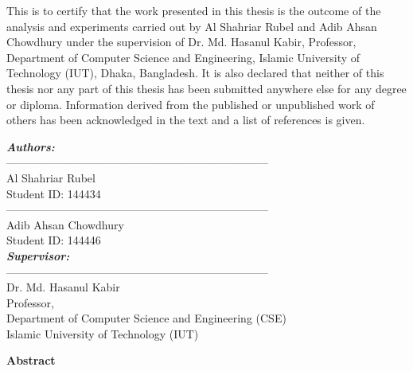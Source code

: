 \documentclass[12pt]{article}
\begin{document}
\noindent This is to certify that the work presented in this thesis is the outcome of the analysis and experiments carried out by Al Shahriar Rubel and Adib Ahsan Chowdhury under the supervision of Dr. Md. Hasanul Kabir, Professor, Department of Computer Science and Engineering, Islamic University of Technology (IUT), Dhaka, Bangladesh. It is also declared that neither of this thesis nor any part of this thesis has been submitted anywhere else for any degree or diploma. Information derived from the published or unpublished work of others has been acknowledged in the text and a list of references is given.

\vspace*{1cm}
\noindent\textit{\Large{\textbf{Authors:}}}\\

\vspace*{1cm}
\noindent -----------------------------------------------------------------------\\
\noindent Al Shahriar Rubel\\
\noindent Student ID: 144434\\ 

\vspace*{1cm}
\noindent -----------------------------------------------------------------------\\
Adib Ahsan Chowdhury\\
Student ID: 144446\\

\vspace*{.7cm}
\noindent\textit{\Large{\textbf{Supervisor:}}}\\

\vspace*{.7cm}
\noindent -----------------------------------------------------------------------\\
Dr. Md. Hasanul Kabir\\
Professor,\\
Department of Computer Science and Engineering (CSE)\\
Islamic University of Technology (IUT)
\newpage
{}
\vspace*{2cm}
\begin{LARGE}
\begin{center}
\textbf{Abstract}
\end{center}
\end{LARGE}
\vspace*{0.7cm}
\end{document}
